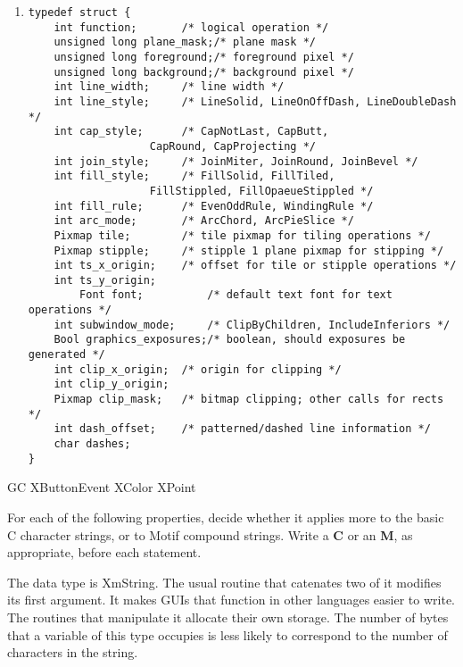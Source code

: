 \documentclass[twoside]{article}
\begin{document}
\begin{enumerate}
\begin{enumerate}
\item
\begin{verbatim}
typedef struct {
	int function;		/* logical operation */
	unsigned long plane_mask;/* plane mask */
	unsigned long foreground;/* foreground pixel */
	unsigned long background;/* background pixel */
	int line_width;		/* line width */
	int line_style;	 	/* LineSolid, LineOnOffDash, LineDoubleDash */
	int cap_style;	  	/* CapNotLast, CapButt, 
				   CapRound, CapProjecting */
	int join_style;	 	/* JoinMiter, JoinRound, JoinBevel */
	int fill_style;	 	/* FillSolid, FillTiled, 
				   FillStippled, FillOpaeueStippled */
	int fill_rule;	  	/* EvenOddRule, WindingRule */
	int arc_mode;		/* ArcChord, ArcPieSlice */
	Pixmap tile;		/* tile pixmap for tiling operations */
	Pixmap stipple;		/* stipple 1 plane pixmap for stipping */
	int ts_x_origin;	/* offset for tile or stipple operations */
	int ts_y_origin;
        Font font;	        /* default text font for text operations */
	int subwindow_mode;     /* ClipByChildren, IncludeInferiors */
	Bool graphics_exposures;/* boolean, should exposures be generated */
	int clip_x_origin;	/* origin for clipping */
	int clip_y_origin;
	Pixmap clip_mask;	/* bitmap clipping; other calls for rects */
	int dash_offset;	/* patterned/dashed line information */
	char dashes;
} 
\end{verbatim}


\end{enumerate}

\begin{enumerate}

\itemsp GC
\itemsp XButtonEvent
\itemsp XColor
\itemsp XPoint

\end{enumerate}

 For each of the following properties, decide whether it
applies more to the basic C character strings, or to Motif
compound strings.  Write a \textbf{C} or an \textbf{M}, as
appropriate, before each statement.

\begin{enumerate}
\itemsp The data type is XmString.
\itemsp The usual routine that catenates two of it modifies its first argument.
\itemsp It makes GUIs that function in other languages easier to write.
\itemsp The routines that manipulate it allocate their own storage.
\itemsp The number of bytes that a variable of this type occupies is less
likely to correspond to the number of characters in the string.
\end{enumerate}




\end{enumerate}
\end{document}
